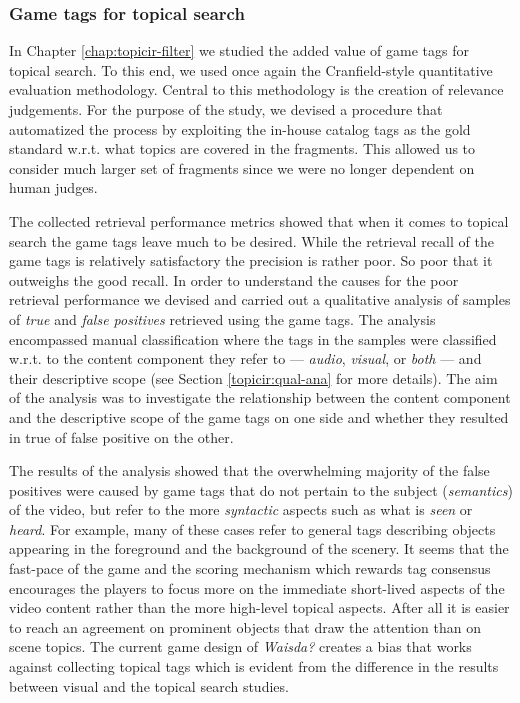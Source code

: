 \subsubsection{Game tags for topical search}
In Chapter \ref{chap:topicir-filter} we studied the added value of game tags for topical search. To this end, we used once again the Cranfield-style quantitative evaluation methodology. Central to this methodology is the creation of relevance judgements. For the purpose of the study, we devised a procedure that automatized the process by exploiting the in-house catalog tags as the gold standard w.r.t. what topics are covered in the fragments. This allowed us to consider much larger set of fragments since we were no longer dependent on human judges. 

The collected retrieval performance metrics showed that when it comes to topical search the game tags leave much to be desired. While the retrieval recall of the game tags is relatively satisfactory the precision is rather poor. So poor that it outweighs the good recall. In order to understand the causes for the  poor retrieval performance we devised and carried out a qualitative analysis of samples of \textit{true} and \textit{false positives} retrieved using the game tags. The analysis encompassed manual classification where the tags in the samples were classified w.r.t. to the content component they refer to --- \textit{audio}, \textit{visual}, or \textit{both} --- and their descriptive scope (see Section \ref{topicir:qual-ana} for more details). The aim of the analysis was to investigate the relationship between the content component and the descriptive scope of the game tags on one side and whether they resulted in true of false positive on the other. 

The results of the analysis showed that the overwhelming majority of the false positives were caused by game tags that do not pertain to the subject (\textit{semantics}) of the video, but refer to the more \textit{syntactic} aspects such as what is \textit{seen} or \textit{heard}. For example, many of these cases refer to general tags describing objects appearing in the foreground and the background of the scenery. It seems that the fast-pace of the game and the scoring mechanism which rewards tag consensus encourages the players to focus more on the immediate short-lived aspects of the video content rather than the more high-level topical aspects. After all it is easier to reach an agreement on prominent objects that draw the attention than on scene topics. The current game design of \textit{Waisda?} creates a bias that works against collecting topical tags which is evident from the difference in the results between visual and the topical search studies. 

